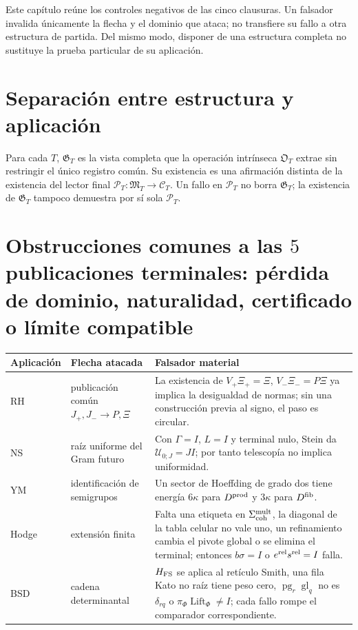 
Este capítulo reúne los controles negativos de las cinco clausuras. Un falsador invalida únicamente la
flecha y el dominio que ataca; no transfiere su fallo a otra estructura de partida.
Del mismo modo, disponer de una estructura completa no sustituye la prueba particular
de su aplicación.

\section{Separación entre estructura y aplicación}

Para cada $T$, $\mathfrak G_T$ es la vista completa que la operación intrínseca
$\mathfrak O_T$ extrae sin restringir el único registro común.
Su existencia es una afirmación distinta de la existencia del lector final
$\mathcal P_T:\mathfrak M_T\to\mathcal C_T$. Un fallo en $\mathcal P_T$ no
borra $\mathfrak G_T$; la existencia de $\mathfrak G_T$ tampoco demuestra por sí
sola $\mathcal P_T$.

\section{Obstrucciones comunes a las \(5\) publicaciones terminales: pérdida de dominio, naturalidad, certificado o límite compatible}

\begin{center}
\begin{tabular}{p{}p{}p{}}
\hline
Aplicación & Flecha atacada & Falsador material \\
\hline
RH & publicación común $J_+,J_-\to P,\Xi$ & La existencia de
$V_+\Xi_+=\Xi$, $V_-\Xi_-=P\Xi$ ya implica la desigualdad de normas; sin una
construcción previa al signo, el paso es circular. \\
NS & raíz uniforme del Gram futuro & Con $\Gamma=I$, $L=I$ y terminal nulo,
Stein da $\mathcal U_{0;J}=JI$; por tanto telescopía no implica uniformidad. \\
YM & identificación de semigrupos & Un sector de Hoeffding de grado dos tiene
energía $6\kappa$ para $D^{\rm prod}$ y $3\kappa$ para $D^{\rm fib}$. \\
Hodge & extensión finita & Falta una etiqueta en
$\Sigma_{\rm coh}^{\rm mult}$, la diagonal de la tabla celular no vale uno,
un refinamiento cambia el pivote global o se elimina el terminal; entonces
$b\sigma=I$ o $e^{\rm rel}s^{\rm rel}=I$ falla. \\
BSD & cadena determinantal & $H_{\rm FS}$ se aplica al retículo Smith, una fila
Kato no raíz tiene peso cero, $\operatorname{pg}_r\operatorname{gl}_q$ no es
$\delta_{rq}$ o $\pi_\Phi\operatorname{Lift}_\Phi\ne I$; cada fallo rompe el
comparador correspondiente. \\
\hline
\end{tabular}
\end{center}

